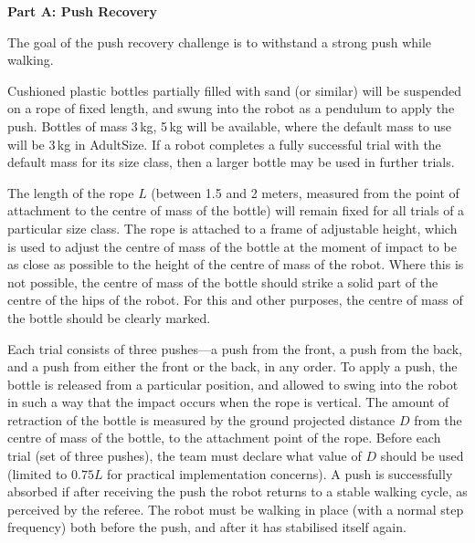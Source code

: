 \clearpage
\sffamily
{\bfseries\color[rgb]{0.4,0.4,0.4}
Part A: Push Recovery }
{}


\bigskip

The goal of the push recovery challenge is to withstand a strong push while walking. 

Cushioned plastic bottles partially filled with sand (or similar) will be
suspended on a rope of fixed length,
and swung into the robot as a pendulum to apply the push.
Bottles of mass  3$\,$kg, 5$\,$kg
 will be available,
where the default mass to use  will be
 3$\,$kg in AdultSize.
If a robot completes a fully successful trial with the default mass for its size
class, then a larger bottle may be used in further trials.

\medskip
The length of the rope $L$ (between 1.5 and 2 meters, measured from the point of 
attachment to the centre of mass of the bottle) will remain fixed for all trials 
of a particular size class.
The rope is attached to a frame of adjustable height,
which is used to adjust the centre of mass of the bottle at the moment of impact
to be as close as possible to the height of the centre of mass of the robot.
Where this is not possible, the centre of mass of the bottle should strike a solid part
of the centre of the hips of the robot.
For this and other purposes, the centre of mass of the bottle should be clearly marked.

\medskip
Each trial consists of three pushes---a push from the front, a push from the back, and a push from either the front or the back, in any order. To apply a push, the bottle is released from a particular position, and allowed to swing into the robot in such a way that the impact occurs when the rope is vertical. The amount of retraction of the bottle is measured by the ground projected distance $D$ from the centre of mass of the bottle, to the attachment point of the rope. Before each trial (set of three pushes), the team must declare what value of $D$ should be used (limited to $0.75L$ for practical implementation concerns). A push is successfully absorbed if after receiving the push the robot 
returns to a stable walking cycle, as perceived by the referee. The robot must be walking in place (with a normal step frequency) both before the push, and after it has stabilised itself again.

